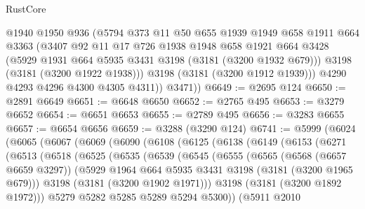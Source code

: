 \begin{lexlean}{RustCore}
\begin{coremodule}
            @1940
            @1950
            @936
            (@5794
              @373
              @11
              @50
              @655
              @1939
              @1949
              @658
              @1911
              @664
              @3363
              (@3407
                @92
                @11
                @17
                @726
                @1938
                @1948
                @658
                @1921
                @664
                @3428
                (@5929 @1931 @664 @5935 @3431 @3198 (@3181 (@3200 @1932 @679)))
                @3198
                (@3181 (@3200 @1922 @1938)))
              @3198
              (@3181 (@3200 @1912 @1939)))
            @4290
            @4293
            @4296
            @4300
            @4305
            @4311))
        @3471))
@6649 := @2695 @124
@6650 := @2891 @6649
@6651 := @6648 @6650
@6652 := @2765 @495
@6653 := @3279 @6652
@6654 := @6651 @6653
@6655 := @2789 @495
@6656 := @3283 @6655
@6657 := @6654 @6656
@6659 := @3288 (@3290 @124)
@6741 := @5999
    (@6024
      (@6065
        (@6067
          (@6069
            (@6090
              (@6108
                (@6125
                  (@6138
                    (@6149
                      (@6153
                        (@6271
                          (@6513
                            (@6518
                              (@6525
                                (@6535
                                  (@6539
                                    (@6545
                                      (@6555
                                        (@6565
                                          (@6568 (@6657 @6659 @3297))
                                          (@5929
                                            @1964
                                            @664
                                            @5935
                                            @3431
                                            @3198
                                            (@3181 (@3200 @1965 @679)))
                                          @3198
                                          (@3181 (@3200 @1902 @1971)))
                                        @3198
                                        (@3181 (@3200 @1892 @1972)))
                                      @5279
                                      @5282
                                      @5285
                                      @5289
                                      @5294
                                      @5300))
                                  (@5911
                                    @2010

\end{coremodule}
\end{lexlean}
